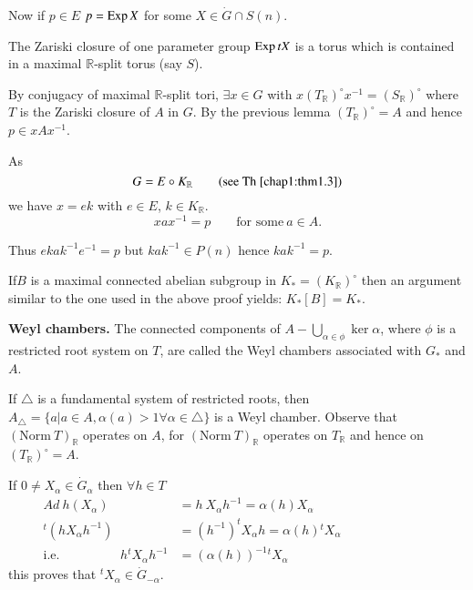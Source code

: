 Now if $p \in E$ \quad $p = \operatorname{Exp} X$ for some $X \in
\dot{G} \cap S(n)$. 

The Zariski closure of one parameter group $\operatorname{Exp} t X$ is a torus which
is contained in a maximal $\mathbb{R}$-split torus (say $S$).

By conjugacy of maximal $\mathbb{R}$-split tori, $\exists x
\in G$ with $x (T_\mathbb{R})^\circ x^{-1}=
(S_\mathbb{R})^\circ$ where $T$ is the Zariski closure of $A$ in
$G$. By the previous lemma $(T_\mathbb{R})^\circ= A$ and hence $p
\in x A x^{-1}$.

As 
\begin{equation*}
  G= E \circ K_\mathbb{R}\qquad  (\text{see Th \ref{chap1:thm1.3}})
\end{equation*}
we have $x = ek$ with $e \in E$, $k \in K_\mathbb{R}$.
$$
x a x^{-1} =p \qquad \text{for some}~ a \in A.
$$

Thus $ekak^{-1} e^{-1}=p$ \quad but $kak^{-1} \in P(n)$ hence
$kak^{-1} =p$.

\begin{remark*}
  If\pageoriginale $B$ is a maximal connected abelian subgroup in $K_* =
  (K_\mathbb{R})^\circ$ then an argument similar to the one used in
  the above proof yields: $K_* [B] = K_*$.
\end{remark*}

\medskip
\noindent \textbf{Weyl chambers.} The connected components of
$\displaystyle{A - \bigcup_{\alpha \in \phi} \ker \alpha}$,
where $\phi$ is a restricted root system on $T$, are called the Weyl
chambers associated with $G_*$ and $A$.

If $\triangle$ is a fundamental system of restricted roots, then
$A_\triangle= \{ a \big| a \in A, \alpha (a)> 1 \forall \alpha
\in \triangle\}$ is a Weyl chamber. Observe that $(\text{Norm}~
T)_\mathbb{R}$ operates on $A$, for $(\text{Norm}~ T)_\mathbb{R}$
operates on $T_\mathbb{R}$ and hence on $(T_\mathbb{R})^\circ=A$.

If $0 \neq X_\alpha \in \dot{G}_\alpha$ then $ \forall h \in T$
\begin{align*}
  Ad ~h (X_\alpha) & = h~ X_\alpha h^{-1}= \alpha (h) X_\alpha\\
  {}^t(h X_\alpha h^{-1})& = (h^{-1})^t X_\alpha h= \alpha (h)
  {}^tX_\alpha \hspace{3cm}\\
  \text{i.e.} \hspace{2cm} h {}^t X_\alpha h^{-1} & = (\alpha(h))^{-1} {}^tX_\alpha
\end{align*}
this proves that ${}^tX_\alpha \in \dot{G}_{-\alpha}$.


